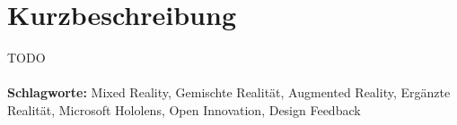 \chapter*{Kurzbeschreibung}
TODO
\\
\\
\textbf{Schlagworte:} Mixed Reality, Gemischte Realität, Augmented Reality, Ergänzte Realität, Microsoft Hololens, Open Innovation, Design Feedback